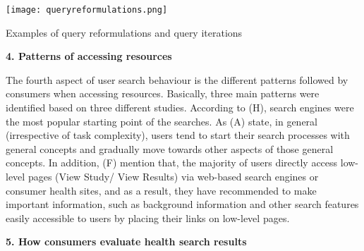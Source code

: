 \documentclass[]{article}
\begin{document}
\begin{table}[t!]
	\texttt{[image: queryreformulations.png]}
	\caption{Examples of query reformulations and query iterations\label{tabel2}}
\end{table} 

\textbf{4. Patterns of accessing resources}

The fourth aspect of user search behaviour is the different patterns followed by consumers when accessing resources. Basically, three main patterns were identified based on three different studies. According to (H), search engines were the most popular starting point of the searches. As (A) state, in general (irrespective of task complexity), users tend to start their search processes with general concepts and gradually move towards other aspects of those general concepts. In addition, (F) mention that, the majority of users directly access low-level pages (View Study/ View Results) via web-based search engines or consumer health sites, and as a result, they have recommended to make important information, such as background information and other search features easily accessible to users by placing their links on low-level pages. 


\textbf{5. How consumers evaluate health search results}
\end{document}
